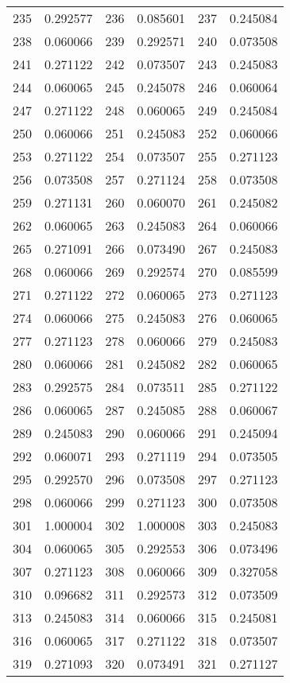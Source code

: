 \documentclass[12pt]{article}
\begin{document}
\begin{longtable}{@{}cc|cc|cc@{}}
235 & 0.292577 & 236 & 0.085601 & 237 & 0.245084 \\
238 & 0.060066 & 239 & 0.292571 & 240 & 0.073508 \\
241 & 0.271122 & 242 & 0.073507 & 243 & 0.245083 \\
244 & 0.060065 & 245 & 0.245078 & 246 & 0.060064 \\
247 & 0.271122 & 248 & 0.060065 & 249 & 0.245084 \\
250 & 0.060066 & 251 & 0.245083 & 252 & 0.060066 \\
253 & 0.271122 & 254 & 0.073507 & 255 & 0.271123 \\
256 & 0.073508 & 257 & 0.271124 & 258 & 0.073508 \\
259 & 0.271131 & 260 & 0.060070 & 261 & 0.245082 \\
262 & 0.060065 & 263 & 0.245083 & 264 & 0.060066 \\
265 & 0.271091 & 266 & 0.073490 & 267 & 0.245083 \\
268 & 0.060066 & 269 & 0.292574 & 270 & 0.085599 \\
271 & 0.271122 & 272 & 0.060065 & 273 & 0.271123 \\
274 & 0.060066 & 275 & 0.245083 & 276 & 0.060065 \\
277 & 0.271123 & 278 & 0.060066 & 279 & 0.245083 \\
280 & 0.060066 & 281 & 0.245082 & 282 & 0.060065 \\
283 & 0.292575 & 284 & 0.073511 & 285 & 0.271122 \\
286 & 0.060065 & 287 & 0.245085 & 288 & 0.060067 \\
289 & 0.245083 & 290 & 0.060066 & 291 & 0.245094 \\
292 & 0.060071 & 293 & 0.271119 & 294 & 0.073505 \\
295 & 0.292570 & 296 & 0.073508 & 297 & 0.271123 \\
298 & 0.060066 & 299 & 0.271123 & 300 & 0.073508 \\
301 & 1.000004 & 302 & 1.000008 & 303 & 0.245083 \\
304 & 0.060065 & 305 & 0.292553 & 306 & 0.073496 \\
307 & 0.271123 & 308 & 0.060066 & 309 & 0.327058 \\
310 & 0.096682 & 311 & 0.292573 & 312 & 0.073509 \\
313 & 0.245083 & 314 & 0.060066 & 315 & 0.245081 \\
316 & 0.060065 & 317 & 0.271122 & 318 & 0.073507 \\
319 & 0.271093 & 320 & 0.073491 & 321 & 0.271127 \\

\end{longtable}
\end{document}
